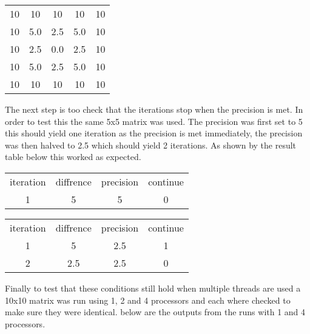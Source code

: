 \documentclass{article}
\begin{document}
\begin{center}
\begin{tabular}{ c c c c c }
 10 & 10 & 10 & 10 & 10 \\
 10 & 5.0 & 2.5 & 5.0 & 10 \\
 10 & 2.5 & 0.0 & 2.5 & 10 \\
 10 & 5.0 & 2.5 & 5.0 & 10 \\
 10 & 10 & 10 & 10 & 10 \\
\end{tabular}
\end{center}

The next step is too check that the iterations stop when the precision is met.
In order to test this the same 5x5 matrix was used. The precision was first set to
5 this should yield one iteration as the precision is met immediately, the precision was
then halved to 2.5 which should yield 2 iterations. As shown by the result table below
this worked as expected.

\begin{center}
\begin{tabular}{ c c c c }
iteration & diffrence & precision & continue \\
 1 & 5 & 5 & 0\\
\end{tabular}
\end{center}

\begin{center}
\begin{tabular}{ c c c c }
iteration & diffrence & precision & continue \\
 1 & 5 & 2.5 & 1\\
 2 & 2.5 & 2.5 & 0\\
\end{tabular}
\end{center}

Finally to test that these conditions still hold when multiple threads are used
a 10x10 matrix was run using 1, 2 and 4 processors and each where checked to make
sure they were identical. below are the outputs from the runs with 1 and 4 processors.
\newpage
\end{document}
